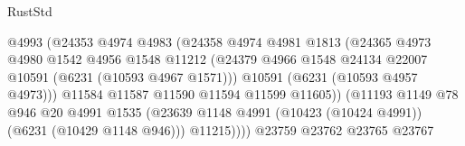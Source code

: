 \begin{lexlean}{RustStd}
\begin{coremodule}
{{                                            @4993
                                            (@24353
                                              @4974
                                              @4983
                                              (@24358
                                                @4974
                                                @4981
                                                @1813
                                                (@24365
                                                  @4973
                                                  @4980
                                                  @1542
                                                  @4956
                                                  @1548
                                                  @11212
                                                  (@24379
                                                    @4966
                                                    @1548
                                                    @24134
                                                    @22007
                                                    @10591
                                                    (@6231 (@10593 @4967 @1571)))
                                                  @10591
                                                  (@6231 (@10593 @4957 @4973)))
                                                @11584
                                                @11587
                                                @11590
                                                @11594
                                                @11599
                                                @11605))
                                            (@11193
                                              @1149
                                              @78
                                              @946
                                              @20
                                              @4991
                                              @1535
                                              (@23639
                                                @1148
                                                @4991
                                                (@10423 (@10424 @4991))
                                                (@6231 (@10429 @1148 @946)))
                                              @11215))))
                                      @23759
                                      @23762
                                      @23765
                                      @23767
}}
\end{coremodule}
\end{lexlean}
